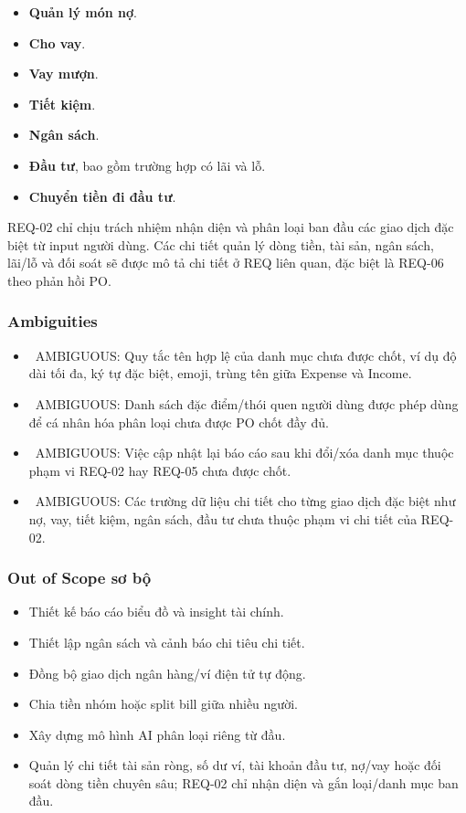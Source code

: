 \begin{itemize}
\item \textbf{Quản lý món nợ}.
\item \textbf{Cho vay}.
\item \textbf{Vay mượn}.
\item \textbf{Tiết kiệm}.
\item \textbf{Ngân sách}.
\item \textbf{Đầu tư}, bao gồm trường hợp có lãi và lỗ.
\item \textbf{Chuyển tiền đi đầu tư}.
\end{itemize}
REQ-02 chỉ chịu trách nhiệm nhận diện và phân loại ban đầu các giao dịch đặc biệt từ input người dùng. Các chi tiết quản lý dòng tiền, tài sản, ngân sách, lãi/lỗ và đối soát sẽ được mô tả chi tiết ở REQ liên quan, đặc biệt là REQ-06 theo phản hồi PO.



\subsubsection{Ambiguities}

\begin{itemize}
\item \warningicon\  AMBIGUOUS: Quy tắc tên hợp lệ của danh mục chưa được chốt, ví dụ độ dài tối đa, ký tự đặc biệt, emoji, trùng tên giữa Expense và Income.
\item \warningicon\  AMBIGUOUS: Danh sách đặc điểm/thói quen người dùng được phép dùng để cá nhân hóa phân loại chưa được PO chốt đầy đủ.
\item \warningicon\  AMBIGUOUS: Việc cập nhật lại báo cáo sau khi đổi/xóa danh mục thuộc phạm vi REQ-02 hay REQ-05 chưa được chốt.
\item \warningicon\  AMBIGUOUS: Các trường dữ liệu chi tiết cho từng giao dịch đặc biệt như nợ, vay, tiết kiệm, ngân sách, đầu tư chưa thuộc phạm vi chi tiết của REQ-02.
\end{itemize}
\subsubsection{Out of Scope sơ bộ}

\begin{itemize}
\item Thiết kế báo cáo biểu đồ và insight tài chính.
\item Thiết lập ngân sách và cảnh báo chi tiêu chi tiết.
\item Đồng bộ giao dịch ngân hàng/ví điện tử tự động.
\item Chia tiền nhóm hoặc split bill giữa nhiều người.
\item Xây dựng mô hình AI phân loại riêng từ đầu.
\item Quản lý chi tiết tài sản ròng, số dư ví, tài khoản đầu tư, nợ/vay hoặc đối soát dòng tiền chuyên sâu; REQ-02 chỉ nhận diện và gắn loại/danh mục ban đầu.
\end{itemize}
